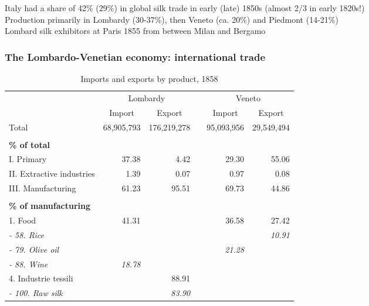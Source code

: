 \documentclass[10pt]{beamer}
\begin{document}
\begin{frame}
\begin{table}[htbp]
\end{table}%

Italy had a share of 42\% (29\%) in global silk trade in early (late) 1850s (almost 2/3 in early 1820s!) \citep[][Table AIII]{federico1997} \\
\smallskip
Production primarily in Lombardy (30-37\%), then Veneto (ca. 20\%) and Piedmont (14-21\%) \citep[][Table AIVa]{federico1997}  \\
\smallskip
Lombard silk exhibitors at Paris 1855 from between Milan and Bergamo %

\end{frame}

\begin{frame}[label = trade_products]
    \frametitle{The Lombardo-Venetian economy: international trade}

\begin{table}[htbp]
  \centering
  \fontsize{8}{8}\selectfont
  \caption{Imports and exports by product, 1858}
    \begin{tabular}{lrrrrr}
    \hline
      & \multicolumn{2}{c}{Lombardy} &   & \multicolumn{2}{c}{Veneto} \\
\cline{2-3}\cline{5-6}      & \multicolumn{1}{c}{Import} & \multicolumn{1}{c}{Export} &   & \multicolumn{1}{c}{Import} & \multicolumn{1}{c}{Export} \\
    \hline
    Total &       68,905,793  &    176,219,278  &   &       95,093,956  &       29,549,494  \\
    \\
    \textbf{\% of total} \\
    I. Primary &                 37.38  &                    4.42  &   &                 29.30  &                 55.06  \\
    II. Extractive industries &                    1.39  &                    0.07  &   &                    0.97  &                    0.08  \\
    III. Manufacturing &                 61.23  &                 95.51  &   &                 69.73  &                 44.86  \\
    \\
    \textbf{\% of manufacturing} \\
    1. Food &                 41.31  &   &   &                 36.58  &                 27.42  \\
    \textit{- 58. Rice} &   &   &   &   &                 \textit{10.91}  \\
    \textit{- 79. Olive oil} &   &   &   &                 \textit{21.28}  &  \\
    \textit{- 88. Wine} &                 \textit{18.78}  &   &   &   &  \\
    4. Industrie tessili &   &                 88.91  &   &   &  \\
    \textit{- 100. Raw silk} &   &                 \textit{83.90}  &   &   &  \\
    \hline
    \end{tabular}%
  \label{tab:trade_products}%


\end{table}
\end{frame}
\end{document}
